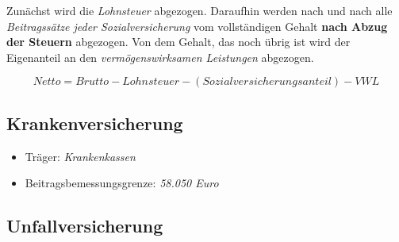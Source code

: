 \documentclass[a4paper, 12pt]{report}
\begin{document}
Zunächst wird die \emph{Lohnsteuer} abgezogen. Daraufhin werden nach und nach 
alle \emph{Beitragssätze jeder Sozialversicherung} vom vollständigen 
Gehalt \textbf{nach Abzug der Steuern} abgezogen. Von dem Gehalt, das noch übrig
ist wird der Eigenanteil an den \emph{vermögenswirksamen Leistungen} abgezogen. 


\begin{center}
    \begin{equation}
        Netto = Brutto - Lohnsteuer - (Sozialversicherungsanteil) - VWL
    \end{equation}
\end{center}

\subsection{Krankenversicherung}

\begin{itemize}
    \item Träger: \emph{Krankenkassen} 
    \item Beitragsbemessungsgrenze: \emph{58.050 Euro}
\end{itemize}

\newpage
\subsection{Unfallversicherung}
\end{document}
